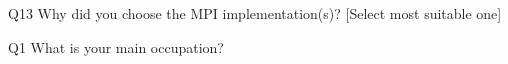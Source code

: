 \begin{description}%
\item{Q13} Why did you choose the MPI implementation(s)? [Select most suitable one]%
\item{Q1} What is your main occupation?%
\end{description}%
